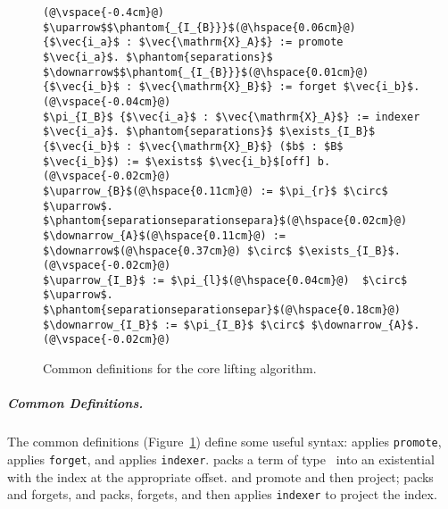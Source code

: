 \iffalse
\begin{figure}
\begin{lstlisting}
(@\vspace{-0.4cm}@)
$\uparrow$$\phantom{_{I_{B}}}$(@\hspace{0.06cm}@) {$\vec{i_a}$ : $\vec{\mathrm{X}_A}$} := promote $\vec{i_a}$. $\phantom{separations}$ $\downarrow$$\phantom{_{I_{B}}}$(@\hspace{0.01cm}@) {$\vec{i_b}$ : $\vec{\mathrm{X}_B}$} := forget $\vec{i_b}$.(@\vspace{-0.04cm}@)
$\pi_{I_B}$ {$\vec{i_a}$ : $\vec{\mathrm{X}_A}$} := indexer $\vec{i_a}$. $\phantom{separations}$ $\exists_{I_B}$ {$\vec{i_b}$ : $\vec{\mathrm{X}_B}$} ($b$ : $B$ $\vec{i_b}$) := $\exists$ $\vec{i_b}$[off] b.(@\vspace{-0.02cm}@)
$\uparrow_{B}$(@\hspace{0.11cm}@) := $\pi_{r}$ $\circ$ $\uparrow$. $\phantom{separationseparationsepara}$(@\hspace{0.02cm}@) $\downarrow_{A}$(@\hspace{0.11cm}@) := $\downarrow$(@\hspace{0.37cm}@) $\circ$ $\exists_{I_B}$.(@\vspace{-0.02cm}@)
$\uparrow_{I_B}$ := $\pi_{l}$(@\hspace{0.04cm}@)  $\circ$ $\uparrow$. $\phantom{separationseparationsepar}$(@\hspace{0.18cm}@) $\downarrow_{I_B}$ := $\pi_{I_B}$ $\circ$ $\downarrow_{A}$.(@\vspace{-0.02cm}@)
\end{lstlisting}
\vspace{-0.3cm}
\caption{Common definitions for the core lifting algorithm.}
\label{fig:convenience}
\end{figure}

\subparagraph*{Common Definitions.} The common definitions (Figure~\ref{fig:convenience}) %
define some useful syntax:
\smallmath{$\uparrow$} applies \lstinline{promote}, \smallmath{$\downarrow$} applies
\lstinline{forget}, and  applies \lstinline{indexer}.
 packs a term of type \B\
into an existential with the index at the appropriate offset.  and  promote and then project;
\smallmath{$\downarrow_{A}$} packs and forgets, and \smallmath{$\downarrow_{I_B}$} packs, forgets, and then 
applies \lstinline{indexer} to project the index.


